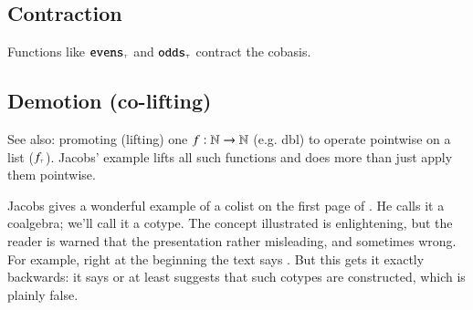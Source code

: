\subsection{Contraction}

Functions like \(\texttt{\upshape evens}_{\scriptscriptstyle\top}\) and \(\texttt{\upshape odds}_{\scriptscriptstyle\top}\) contract the
cobasis.

\subsection{Demotion (co-lifting)}

See also: promoting (lifting) one \(f:\mathbb{N}\rightarrow\mathbb{N}\) (e.g. dbl) to
operate pointwise on a list (\(f_{\scriptscriptstyle\top}\)). Jacobs' example lifts all
such functions and does more than just apply them pointwise.

Jacobs gives a wonderful example of a colist on the first page of
\parencite{2017intro_coalgebra}. He calls it a coalgebra; we'll call
it a cotype. The concept illustrated is enlightening, but the reader
is warned that the presentation rather misleading, and sometimes
wrong. For example, right at the beginning the text says
. But this gets it
exactly backwards: it says or at least suggests that such cotypes are
constructed, which is plainly false.

